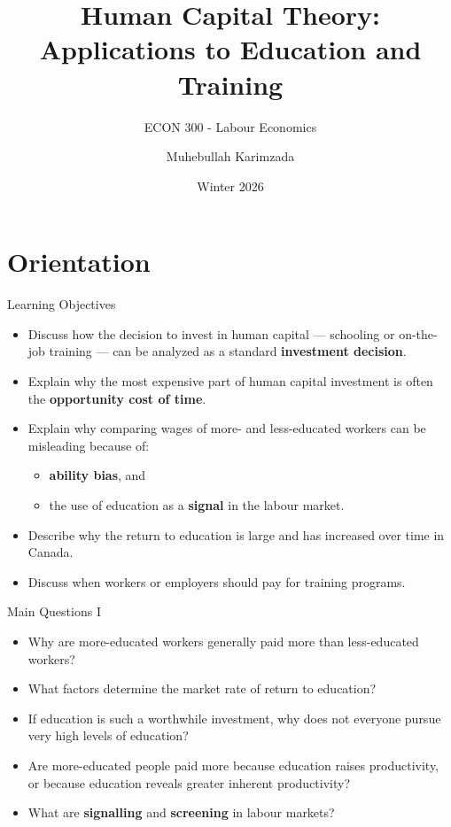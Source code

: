 \documentclass[aspectratio=169]{beamer}
\title{\textbf{Human Capital Theory: Applications to Education and Training}}
\subtitle{{\large ECON 300 - Labour Economics}}
\author{Muhebullah Karimzada}
\date{Winter 2026}
\begin{document}
\begin{frame}[plain]
  \titlepage
\end{frame}

\section{Orientation}

\begin{frame}{Learning Objectives}
\transfade
\begin{itemize}
  \item Discuss how the decision to invest in human capital --- schooling or on-the-job training --- can be analyzed as a standard \textbf{investment decision}.
  \item Explain why the most expensive part of human capital investment is often the \textbf{opportunity cost of time}.
  \item Explain why comparing wages of more- and less-educated workers can be misleading because of:
  \begin{itemize}
    \item \textbf{ability bias}, and
    \item the use of education as a \textbf{signal} in the labour market.
  \end{itemize}
  \item Describe why the return to education is large and has increased over time in Canada.
  \item Discuss when workers or employers should pay for training programs.
\end{itemize}
\end{frame}

\begin{frame}{Main Questions I}
\transfade
\begin{itemize}
  \item Why are more-educated workers generally paid more than less-educated workers?
  \item What factors determine the market rate of return to education?
  \item If education is such a worthwhile investment, why does not everyone pursue very high levels of education?
  \item Are more-educated people paid more because education raises productivity, or because education reveals greater inherent productivity?
  \item What are \textbf{signalling} and \textbf{screening} in labour markets?
\end{itemize}
\end{frame}
\end{document}
